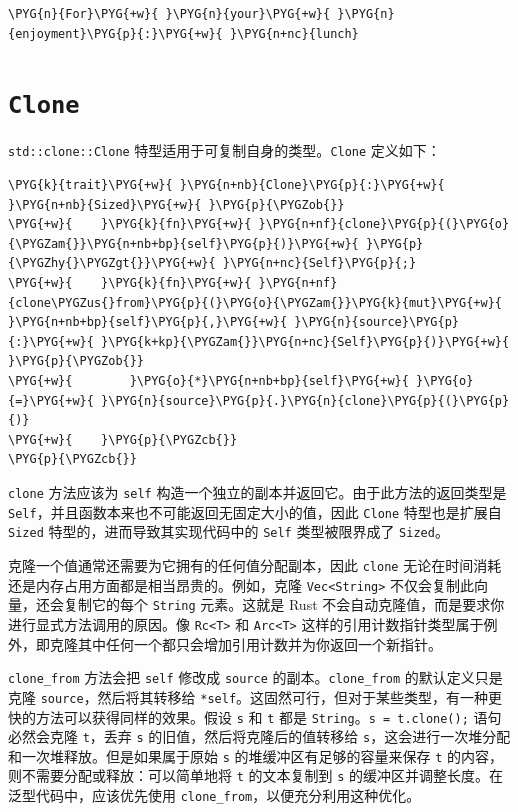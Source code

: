 \begin{Verbatim}[commandchars=\\\{\},breaklines=true,breakanywhere=true,fontsize=\codefont,xleftmargin=17bp]
\PYG{n}{For}\PYG{+w}{ }\PYG{n}{your}\PYG{+w}{ }\PYG{n}{enjoyment}\PYG{p}{:}\PYG{+w}{ }\PYG{n+nc}{lunch}
\end{Verbatim}

\section{\texttt{Clone}}

\texttt{std::clone::Clone} 特型适用于可复制自身的类型。\texttt{Clone} 定义如下：

\begin{Verbatim}[commandchars=\\\{\},breaklines=true,breakanywhere=true,fontsize=\codefont,xleftmargin=17bp]
\PYG{k}{trait}\PYG{+w}{ }\PYG{n+nb}{Clone}\PYG{p}{:}\PYG{+w}{ }\PYG{n+nb}{Sized}\PYG{+w}{ }\PYG{p}{\PYGZob{}}
\PYG{+w}{    }\PYG{k}{fn}\PYG{+w}{ }\PYG{n+nf}{clone}\PYG{p}{(}\PYG{o}{\PYGZam{}}\PYG{n+nb+bp}{self}\PYG{p}{)}\PYG{+w}{ }\PYG{p}{\PYGZhy{}\PYGZgt{}}\PYG{+w}{ }\PYG{n+nc}{Self}\PYG{p}{;}
\PYG{+w}{    }\PYG{k}{fn}\PYG{+w}{ }\PYG{n+nf}{clone\PYGZus{}from}\PYG{p}{(}\PYG{o}{\PYGZam{}}\PYG{k}{mut}\PYG{+w}{ }\PYG{n+nb+bp}{self}\PYG{p}{,}\PYG{+w}{ }\PYG{n}{source}\PYG{p}{:}\PYG{+w}{ }\PYG{k+kp}{\PYGZam{}}\PYG{n+nc}{Self}\PYG{p}{)}\PYG{+w}{ }\PYG{p}{\PYGZob{}}
\PYG{+w}{        }\PYG{o}{*}\PYG{n+nb+bp}{self}\PYG{+w}{ }\PYG{o}{=}\PYG{+w}{ }\PYG{n}{source}\PYG{p}{.}\PYG{n}{clone}\PYG{p}{(}\PYG{p}{)}
\PYG{+w}{    }\PYG{p}{\PYGZcb{}}
\PYG{p}{\PYGZcb{}}
\end{Verbatim}

\texttt{clone} 方法应该为 \texttt{self} 构造一个独立的副本并返回它。由于此方法的返回类型是 \texttt{Self}，并且函数本来也不可能返回无固定大小的值，因此 \texttt{Clone} 特型也是扩展自 \texttt{Sized} 特型的，进而导致其实现代码中的 \texttt{Self} 类型被限界成了 \texttt{Sized}。

克隆一个值通常还需要为它拥有的任何值分配副本，因此 \texttt{clone} 无论在时间消耗还是内存占用方面都是相当昂贵的。例如，克隆 \texttt{Vec<String>} 不仅会复制此向量，还会复制它的每个 \texttt{String} 元素。这就是 Rust 不会自动克隆值，而是要求你进行显式方法调用的原因。像 \texttt{Rc<T>} 和 \texttt{Arc<T>} 这样的引用计数指针类型属于例外，即克隆其中任何一个都只会增加引用计数并为你返回一个新指针。

\texttt{clone\_from} 方法会把 \texttt{self} 修改成 \texttt{source} 的副本。\texttt{clone\_from} 的默认定义只是克隆 \texttt{source}，然后将其转移给 \texttt{*self}。这固然可行，但对于某些类型，有一种更快的方法可以获得同样的效果。假设 \texttt{s} 和 \texttt{t} 都是 \texttt{String}。\texttt{s = t.clone();} 语句必然会克隆 \texttt{t}，丢弃 \texttt{s} 的旧值，然后将克隆后的值转移给 \texttt{s}，这会进行一次堆分配和一次堆释放。但是如果属于原始 \texttt{s} 的堆缓冲区有足够的容量来保存 \texttt{t} 的内容，则不需要分配或释放：可以简单地将 \texttt{t} 的文本复制到 \texttt{s} 的缓冲区并调整长度。在泛型代码中，应该优先使用 \texttt{clone\_from}，以便充分利用这种优化。

